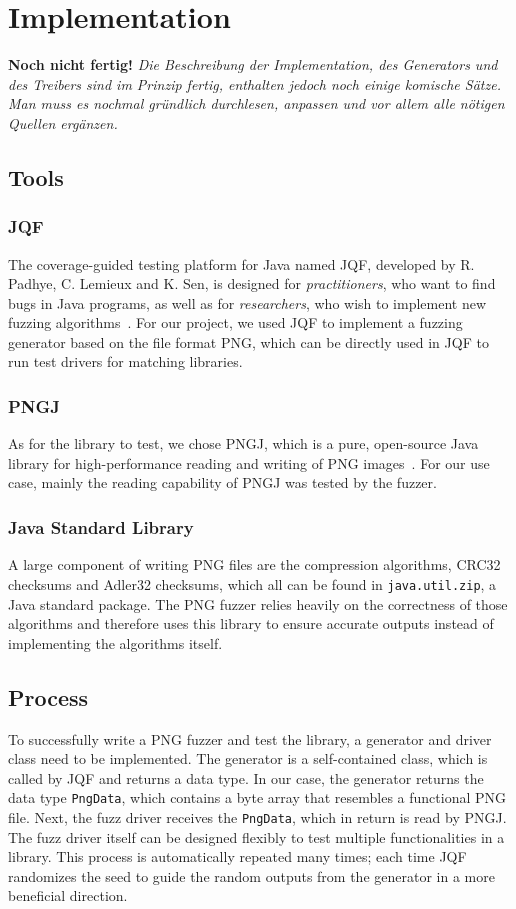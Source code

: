 \documentclass[runningheads]{llncs}
\begin{document}
\section{Implementation}
\textbf{Noch nicht fertig!} \textit{Die Beschreibung der Implementation, des Generators und des Treibers sind im Prinzip fertig, enthalten jedoch noch einige komische Sätze. Man muss es nochmal gründlich durchlesen, anpassen und vor allem alle nötigen Quellen ergänzen.}
\subsection{Tools}
\subsubsection{JQF}
The coverage-guided testing platform for Java named JQF, developed by R. Padhye, C. Lemieux and K. Sen, is designed for \textit{practitioners}, who want to find bugs in Java programs, as well as for \textit{researchers}, who wish to implement new fuzzing algorithms~\cite{JQF_paper}. For our project, we used JQF to implement a fuzzing generator based on the file format PNG, which can be directly used in JQF to run test drivers for matching libraries.
\subsubsection{PNGJ}
As for the library to test, we chose PNGJ, which is a pure, open-source Java library for high-performance reading and writing of PNG images~\cite{PNGJ_github}. For our use case, mainly the reading capability of PNGJ was tested by the fuzzer.
\subsubsection{Java Standard Library}
A large component of writing PNG files are the compression algorithms, CRC32 checksums and Adler32 checksums, which all can be found in \texttt{java.util.zip}, a Java standard package. The PNG fuzzer relies heavily on the correctness of those algorithms and therefore uses this library to ensure accurate outputs instead of implementing the algorithms itself.
\subsection{Process}
To successfully write a PNG fuzzer and test the library, a generator and driver class need to be implemented. The generator is a self-contained class, which is called by JQF and returns a data type. In our case, the generator returns the data type \texttt{PngData}, which contains a byte array that resembles a functional PNG file. Next, the fuzz driver receives the \texttt{PngData}, which in return is read by PNGJ. The fuzz driver itself can be designed flexibly to test multiple functionalities in a library. This process is automatically repeated many times; each time JQF randomizes the seed to guide the random outputs from the generator in a more beneficial direction.
\end{document}
